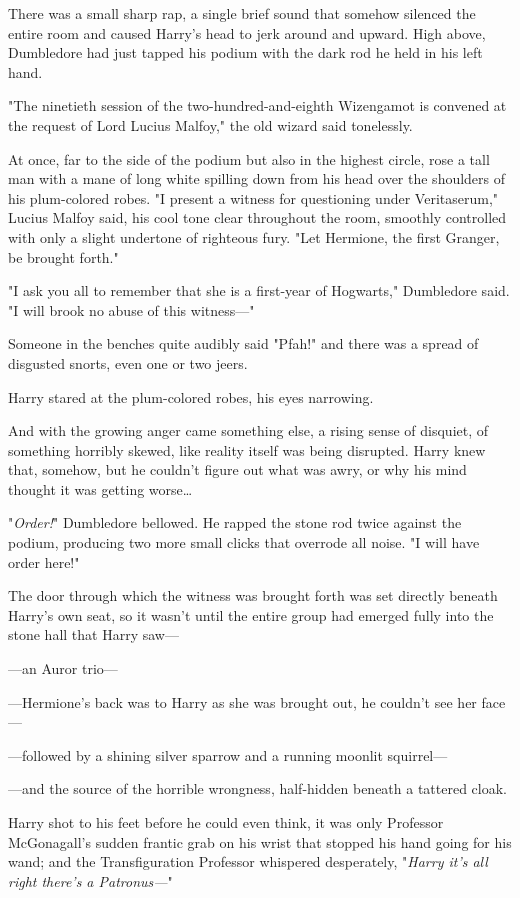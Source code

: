 There was a small sharp rap, a single brief sound that somehow silenced the
entire room and caused Harry's head to jerk around and upward. High above,
Dumbledore had just tapped his podium with the dark rod he held in his left
hand.

"The ninetieth session of the two-hundred-and-eighth Wizengamot is convened at
the request of Lord Lucius Malfoy," the old wizard said tonelessly.

At once, far to the side of the podium but also in the highest circle, rose a
tall man with a mane of long white spilling down from his head over the
shoulders of his plum-colored robes. "I present a witness for questioning under
Veritaserum," Lucius Malfoy said, his cool tone clear throughout the room,
smoothly controlled with only a slight undertone of righteous fury. "Let
Hermione, the first Granger, be brought forth."

"I ask you all to remember that she is a first-year of Hogwarts," Dumbledore
said. "I will brook no abuse of this witness---"

Someone in the benches quite audibly said "Pfah!" and there was a spread of
disgusted snorts, even one or two jeers.

Harry stared at the plum-colored robes, his eyes narrowing.

And with the growing anger came something else, a rising sense of disquiet, of
something horribly skewed, like reality itself was being disrupted. Harry knew
that, somehow, but he couldn't figure out what was awry, or why his mind
thought it was getting worse{\ldots}

"\emph{Order!}" Dumbledore bellowed. He rapped the stone rod twice against the
podium, producing two more small clicks that overrode all noise. "I will have
order here!"

The door through which the witness was brought forth was set directly beneath
Harry's own seat, so it wasn't until the entire group had emerged fully into
the stone hall that Harry saw---

---an Auror trio---

---Hermione's back was to Harry as she was brought out, he couldn't see her
face---

---followed by a shining silver sparrow and a running moonlit squirrel---

---and the source of the horrible wrongness, half-hidden beneath a tattered
cloak.

Harry shot to his feet before he could even think, it was only Professor
McGonagall's sudden frantic grab on his wrist that stopped his hand going for
his wand; and the Transfiguration Professor whispered desperately, "\emph{Harry
it's all right there's a Patronus---}"

